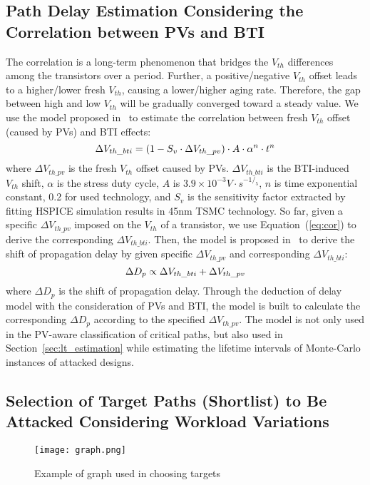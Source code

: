 \subsection{Path Delay Estimation Considering the Correlation between PVs and BTI}
\label{sec:frame:cor}
The correlation is a long-term phenomenon that bridges the $V_{th}$ differences among the transistors over a period. Further, a positive/negative $V_{th}$ offset leads to a higher/lower fresh $V_{th}$, causing a lower/higher aging rate. Therefore, the gap between high and low $V_{th}$ will be gradually converged toward a steady value. We use the model proposed in~\cite{gomez2016early} to estimate the correlation between fresh $V_{th}$ offset (caused by PVs) and BTI effects:
\begin{equation}
	\centering
	\fontsize{9}{9} \selectfont
	\Delta V_{th\_bti} = (1 - S_{v} \cdot \Delta V_{th\_pv})  \cdot A \cdot \alpha^n \cdot t^n
	\label{eq:cor}
\end{equation}
where $\Delta V_{th\_pv}$ is the fresh $V_{th}$ offset caused by PVs. $\Delta V_{th\_bti}$ is the BTI-induced $V_{th}$ shift, $\alpha$ is the stress duty cycle, $A$ is $3.9 \times 10^{-3} V \cdot s^{-1/_5}$, $n$ is time exponential constant, 0.2 for used technology, and $S_{v}$ is the sensitivity factor extracted by fitting HSPICE simulation results in 45nm TSMC technology. So far, given a specific $\Delta V_{th\_pv}$ imposed on the $V_{th}$ of a transistor, we use Equation~(\ref{eq:cor}) to derive the corresponding $\Delta V_{th\_bti}$. Then, the model is proposed in~\cite{wang2007efficient} to derive the shift of propagation delay by given specific $\Delta V_{th\_pv}$ and corresponding $\Delta V_{th\_bti}$:
\begin{equation}
	\centering
	\fontsize{9}{9} \selectfont
	\Delta D_{p} \propto \Delta V_{th\_bti} + \Delta V_{th\_pv}
	\label{eq:vtodelay}
\end{equation}	
where $\Delta D_{p}$ is the shift of propagation delay. Through the deduction of delay model with the consideration of PVs and BTI, the model is built to calculate the corresponding $\Delta D_{p}$ according to the specified $\Delta V_{th\_pv}$. The model is not only used in the PV-aware classification of critical paths, but also used in Section~\ref{sec:lt_estimation} while estimating the lifetime intervals of Monte-Carlo instances of attacked designs. 
\subsection{Selection of Target Paths (Shortlist) to Be Attacked Considering Workload Variations}
\label{sec:frame:workload}
\begin{figure}
	\centering
	\texttt{[image: graph.png]}
	\caption{Example of graph used in choosing targets}
	\label{fig:graph}
\end{figure}

